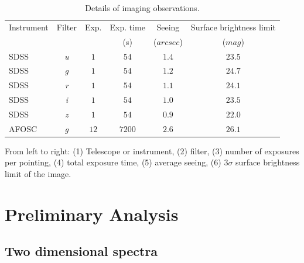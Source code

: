 \documentclass[../main.tex]{subfiles}
\begin{document}
\begin{table}
    \centering
    \caption{Details of imaging observations.}
    \label{tab:obs_image}
    \begin{threeparttable}
    \begin{tabular}{lccccc}
    \hline
    \hline
    Instrument& Filter & Exp.& Exp. time & Seeing & Surface brightness limit \\
    & & & (s) & ($\si{arcsec}$)& ($\si{mag}$)\\   
    \hline
    SDSS &\emph{u}&$1$ &$54$ &$1.4$&$23.5$\\
    SDSS &\emph{g}&$1$ &$54$ &$1.2$&$24.7$\\
    SDSS &\emph{r}&$1$ &$54$ &$1.1$&$24.1$\\
    SDSS &\emph{i}&$1$ &$54$ &$1.0$&$23.5$\\
    SDSS &\emph{z}&$1$ &$54$ &$0.9$&$22.0$\\
    AFOSC&\emph{g}&$12$&$7200$&$2.6$&$26.1$\\
    \hline
    \end{tabular}
    \begin{tablenotes}
    \item From left to right: (1) Telescope or instrument, (2) filter, (3) number of exposures per pointing, (4) total exposure time, (5) average seeing, (6) $3\sigma$ surface brightness limit of the image.
    \end{tablenotes}
    \end{threeparttable}
\end{table}

\section{Preliminary Analysis}
\label{sec:analysis1_pap3}

\subsection{Two dimensional spectra}
\label{sec:2dspectra}
\end{document}
